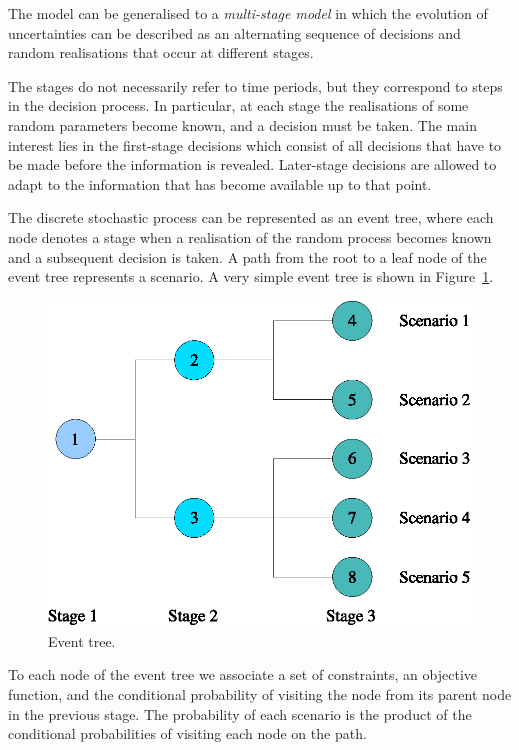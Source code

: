 The model can be generalised to a {\em multi-stage model} in which 
the evolution of uncertainties can be 
described as an alternating sequence of decisions and random 
realisations that occur at different stages.

The stages do not necessarily refer to time periods, but they correspond
to steps in the decision process. In particular, at each stage the
realisations of some random parameters become known, and a decision
must be taken.
The main interest lies in the 
first-stage decisions which consist of all decisions that have to
be made before the information is revealed. Later-stage decisions 
are allowed to adapt to the information that has become available 
up to that point.

The discrete stochastic process can be represented as an event tree,
where each node denotes a stage when a realisation 
of the random process becomes known and a subsequent decision is taken.
A path from the root to a leaf node of the event tree represents a 
scenario.
A very simple event tree is shown in Figure~\ref{fig:EventTree}.
%
\begin{figure}[ht]
  \begin{center}
    \includegraphics[scale=0.6]{figures/tree.eps}
    \caption{Event tree.}
    \label{fig:EventTree}
  \end{center}
  \vspace{-3ex}
\end{figure}

To each node of the event tree we associate a set of constraints, an 
objective function, and the conditional probability of visiting the 
node from its parent node in the previous stage.
The probability of each scenario is the product of the 
conditional probabilities of visiting each node on the path.

